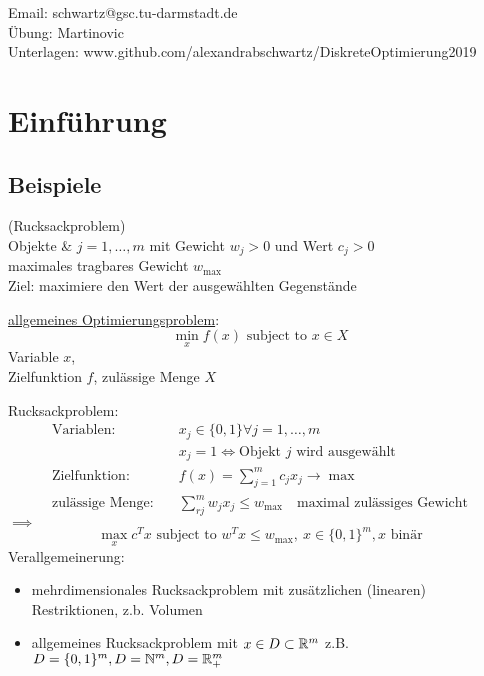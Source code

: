 Email: schwartz@gsc.tu-darmstadt.de\\
Übung: Martinovic\\
Unterlagen: www.github.com/alexandrabschwartz/DiskreteOptimierung2019

\section{Einführung}
\subsection{Beispiele}
\begin{beispiel}
	(Rucksackproblem)\\
	Objekte & $j=1,\dots,m$ mit Gewicht $w_{j}>0$ und Wert $c_{j}>0$\\
	maximales tragbares Gewicht $w_{\max}$\\
	Ziel: maximiere den Wert der ausgewählten Gegenstände \\
\end{beispiel} 

\underline{allgemeines Optimierungsproblem}:\\
\begin{equation*}
	\min_{x} f(x) \text{ subject to } x \in X
\end{equation*} 
Variable $x$,\\ 
Zielfunktion $f$, 
zulässige Menge $X$

Rucksackproblem: 
\begin{align*}
\text{Variablen}:\quad & x_{j} \in \{0,1\} \forall j =1, \dots, m\\
				 & x_{j}=1 \iff \text{Objekt $j$ wird ausgewählt}\\
\text{Zielfunktion}:\quad& f(x)= \sum_{j=1}^{m} c_j x_{j}\rightarrow \max\\
\text{zulässige Menge}:\quad & \sum_{rj}^{m} w_j x_j \leq w_{\max}\quad \text{maximal zulässiges Gewicht}
\end{align*} 
$\implies$ 
\begin{equation*}
	\max_{x}c^Tx \text{ subject to } w^Tx \leq w_{\max},\ x \in \{0,1\}^m, x \text{ binär}
\end{equation*}
Verallgemeinerung:
\begin{itemize}
	\item mehrdimensionales Rucksackproblem mit zusätzlichen (linearen) Restriktionen, z.b. Volumen
	\item allgemeines Rucksackproblem mit $x\in D\subset \mathbb{R}^m$ z.B. $D=\{0,1\}^m, D=\mathbb{N}^m , D = \mathbb{R}_{+}^m$
\end{itemize} 

